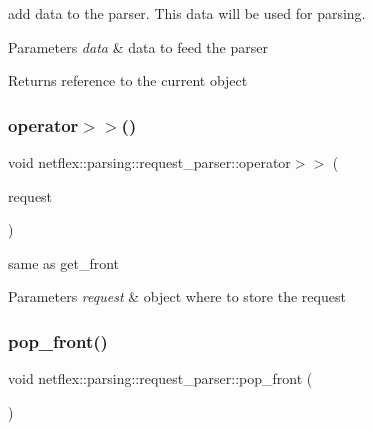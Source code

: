 add data to the parser. This data will be used for parsing.


\begin{DoxyParams}{Parameters}
{\em data} & data to feed the parser \\
\hline
\end{DoxyParams}
\begin{DoxyReturn}{Returns}
reference to the current object 
\end{DoxyReturn}
\mbox{\label{classnetflex_1_1parsing_1_1request__parser_a04e1c01d3e1dfa09df931bfb0c866e07}} 
\subsubsection{\texorpdfstring{operator$>$$>$()}{operator>>()}}
{\footnotesize\ttfamily void netflex\+::parsing\+::request\+\_\+parser\+::operator$>$$>$ (\begin{DoxyParamCaption}\item[{\hyperlink{classnetflex_1_1http_1_1request}{http\+::request} \&}]{request }\end{DoxyParamCaption})}

same as get\+\_\+front


\begin{DoxyParams}{Parameters}
{\em request} & object where to store the request \\
\hline
\end{DoxyParams}
\mbox{\label{classnetflex_1_1parsing_1_1request__parser_abd61692d9c98b6d02733afcd9b5fe5ce}} 
\subsubsection{\texorpdfstring{pop\+\_\+front()}{pop\_front()}}
{\footnotesize\ttfamily void netflex\+::parsing\+::request\+\_\+parser\+::pop\+\_\+front (\begin{DoxyParamCaption}\item[{void}]{ }\end{DoxyParamCaption})}

